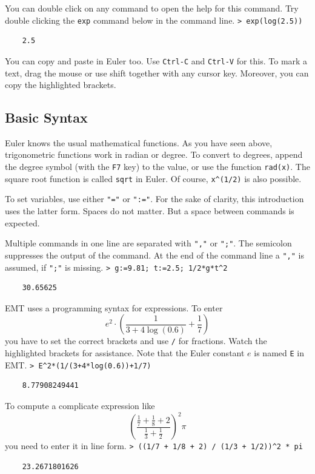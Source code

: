 \documentclass[11pt, a4paper]{article}
\newcommand{\emtcmd}[1]{\noindent\texttt{\textcolor{emtcommand}{>}\ #1}\par\smallskip}
\begin{document}
You can double click on any command to open the help for this command. Try double clicking the \texttt{exp} command below in the command line.
\emtcmd{exp(log(2.5))}
\begin{verbatim}
    2.5
\end{verbatim}

You can copy and paste in Euler too. Use \texttt{Ctrl-C} and \texttt{Ctrl-V} for this. To mark a text, drag the mouse or use shift together with any cursor key. Moreover, you can copy the highlighted brackets.

\subsection*{Basic Syntax}

Euler knows the usual mathematical functions. As you have seen above, trigonometric functions work in radian or degree. To convert to degrees, append the degree symbol (with the \texttt{F7} key) to the value, or use the function \texttt{rad(x)}. The square root function is called \texttt{sqrt} in Euler. Of course, \texttt{x\^{}(1/2)} is also possible.

To set variables, use either \texttt{"="} or \texttt{":="}. For the sake of clarity, this introduction uses the latter form. Spaces do not matter. But a space between commands is expected.

Multiple commands in one line are separated with \texttt{","} or \texttt{";"}. The semicolon suppresses the output of the command. At the end of the command line a \texttt{","} is assumed, if \texttt{";"} is missing.
\emtcmd{g:=9.81; t:=2.5; 1/2*g*t\^{}2}
\begin{verbatim}
    30.65625
\end{verbatim}

EMT uses a programming syntax for expressions. To enter
$$e^2 \cdot \left( \frac{1}{3+4 \log(0.6)}+\frac{1}{7} \right)$$
you have to set the correct brackets and use \texttt{/} for fractions. Watch the highlighted brackets for assistance. Note that the Euler constant $e$ is named \texttt{E} in EMT.
\emtcmd{E\^{}2*(1/(3+4*log(0.6))+1/7)}
\begin{verbatim}
    8.77908249441
\end{verbatim}

To compute a complicate expression like
$$\left(\frac{\frac{1}{7} + \frac{1}{8} + 2}{\frac{1}{3} + \frac{1}{2}}\right)^2 \pi$$
you need to enter it in line form.
\emtcmd{((1/7 + 1/8 + 2) / (1/3 + 1/2))\^{}2 * pi}
\begin{verbatim}
    23.2671801626
\end{verbatim}
\end{document}
